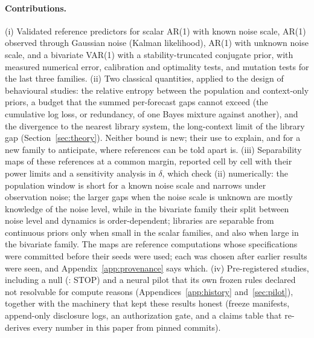 \paragraph{Contributions.}
(i) Validated reference predictors for scalar AR(1) with known noise scale, AR(1) observed through Gaussian noise (Kalman
likelihood), AR(1) with unknown noise scale, and a bivariate VAR(1) with a stability-truncated conjugate prior, with
measured numerical error, calibration and optimality tests, and mutation tests for the last three families.
(ii) Two classical quantities, applied to the design of behavioural studies: the relative entropy between the population and
context-only priors, a budget that the summed per-forecast gaps cannot exceed (the cumulative log loss, or redundancy, of one
Bayes mixture against another), and the divergence to the nearest library system, the long-context limit of the library gap
(Section~\ref{sec:theory}). Neither bound is new; their use to explain, and for a new family to anticipate, where
references can be told apart is.
(iii) Separability maps of these references at a common margin, reported cell by cell with their power limits and a
sensitivity analysis in $\delta$, which check (ii) numerically: the population window is short for a known noise scale and
narrows under observation noise; the larger gaps when the noise scale is unknown are mostly knowledge of the noise level, while
in the bivariate family their split between noise level and dynamics is order-dependent; libraries are separable from
continuous priors only when small in the
scalar families, and also when large in the bivariate family. The maps are reference computations whose specifications were
committed before their seeds were used; each was chosen after earlier results were seen, and
Appendix~\ref{app:provenance} says which. (iv) Pre-registered studies, including a null (\sSix: STOP) and a neural pilot that its own frozen rules
declared not resolvable for compute reasons (Appendices~\ref{app:history} and~\ref{sec:pilot}), together with the machinery that
kept these results honest (freeze manifests, append-only disclosure logs, an authorization gate, and a claims table that
re-derives every number in this paper from pinned commits).
